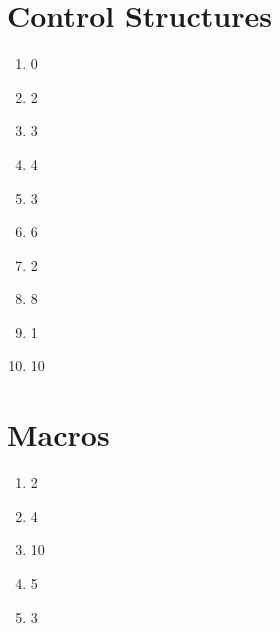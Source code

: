 \documentclass{article}
\begin{document}
  \section{Control Structures}
  \begin{enumerate}
    
            \item
        
                  0
        
            \item
        
                  2
        
            \item
        
                  3
        
            \item
        
                  4
        
            \item
        
                  3
        
            \item
        
                  6
        
            \item
        
                  2
        
            \item
        
                  8
        
            \item
        
                  1
        
            \item
        
                  10
        
      \end{enumerate}

  \section{Macros}
    
              \begin{enumerate}
                  \item 2
                  \item 4
                  \item 10
                  \item 5
                  \item 3
              \end{enumerate}
    
\end{document}

